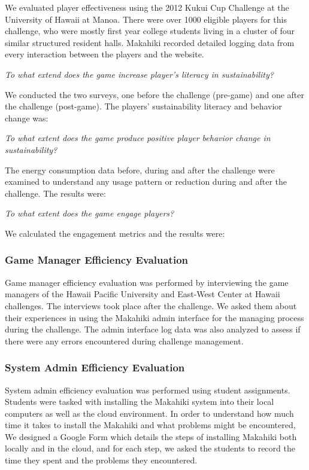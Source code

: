 \documentclass{sigchi}
\begin{document}
We evaluated player effectiveness using the 2012 Kukui Cup Challenge at
the University of Hawaii at Manoa. There were over 1000 eligible players
for this challenge, who were mostly first year college students living
in a cluster of four similar structured resident halls. Makahiki
recorded detailed logging data from every interaction between the
players and the website.

\emph{To what extend does the game increase player's literacy in
  sustainability?}

We conducted the two surveys, one before the challenge (pre-game) and
one after the challenge (post-game). The players' sustainability
literacy and behavior change was:

\emph{To what extent does the game produce positive player behavior
  change in sustainability?}

The energy consumption data before, during and after the challenge were
examined to understand any usage pattern or reduction during and after
the challenge. The results were:

\emph{To what extent does the game engage players?}

We calculated the engagement metrics and the results were:


\subsubsection{Game Manager Efficiency Evaluation}

Game manager efficiency evaluation was performed by interviewing the
game managers of the Hawaii Pacific University and East-West Center at
Hawaii challenges. The interviews took place after the challenge. We
asked them about their experiences in using the Makahiki admin
interface for the managing process during the challenge. The admin
interface log data was also analyzed to assess if there were any errors
encountered during challenge management.


\subsubsection{System Admin Efficiency Evaluation}

System admin efficiency evaluation was performed using student assignments. Students were tasked with installing the Makahiki
system into their local computers as well as the cloud environment. In
order to understand how much time it takes to install the Makahiki and
what problems might be encountered, We designed a Google Form which
details the steps of installing Makahiki both locally and in the
cloud, and for each step, we asked the students to record the time
they spent and the problems they encountered.
\end{document}
